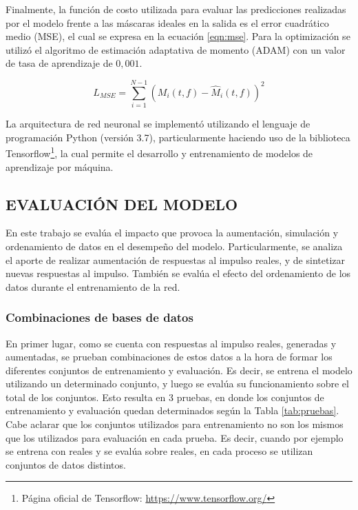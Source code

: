Finalmente, la función de costo utilizada para evaluar las predicciones realizadas por el modelo frente a las máscaras ideales en la salida es el error cuadrático medio (MSE), el cual se expresa en la ecuación \ref{eqn:mse}. Para la optimización se utilizó el algoritmo de estimación adaptativa de momento (ADAM) \cite{adam} con un valor de tasa de aprendizaje de $0,001$. 

\begin{equation}
\label{eqn:mse}
	L_{MSE} = \sum_{i=1}^{N-1}(M_{i}(t,f) - \hat{M}_{i}(t,f))^{2}
\end{equation}

La arquitectura de red neuronal se implementó utilizando el lenguaje de programación Python (versión 3.7), particularmente haciendo uso de la biblioteca Tensorflow\footnote{Página oficial de Tensorflow: \url{https://www.tensorflow.org/}}, la cual permite el desarrollo y entrenamiento de modelos de aprendizaje por máquina.  


\subsection[Evaluación del modelo]{EVALUACIÓN DEL MODELO}
En este trabajo se evalúa el impacto que provoca la aumentación, simulación y ordenamiento de datos en el desempeño del modelo.
Particularmente, se analiza el aporte de realizar aumentación de respuestas al impulso reales, y de sintetizar nuevas respuestas al impulso. También se evalúa el efecto del ordenamiento de los datos durante el entrenamiento de la red.

\subsubsection{Combinaciones de bases de datos}
En primer lugar, como se cuenta con respuestas al impulso reales, generadas  y aumentadas, se prueban combinaciones de estos datos a la hora de formar los diferentes conjuntos de entrenamiento y evaluación. Es decir, se entrena el modelo utilizando un determinado conjunto, y luego se evalúa su funcionamiento sobre el total de los conjuntos. Esto resulta en 3 pruebas, en donde los conjuntos de entrenamiento y evaluación quedan determinados según la Tabla \ref{tab:pruebas}. Cabe aclarar que los conjuntos utilizados para entrenamiento no son los mismos que los utilizados para evaluación en cada prueba. Es decir, cuando por ejemplo se entrena con reales y se evalúa sobre reales, en cada proceso se utilizan conjuntos de datos distintos.


